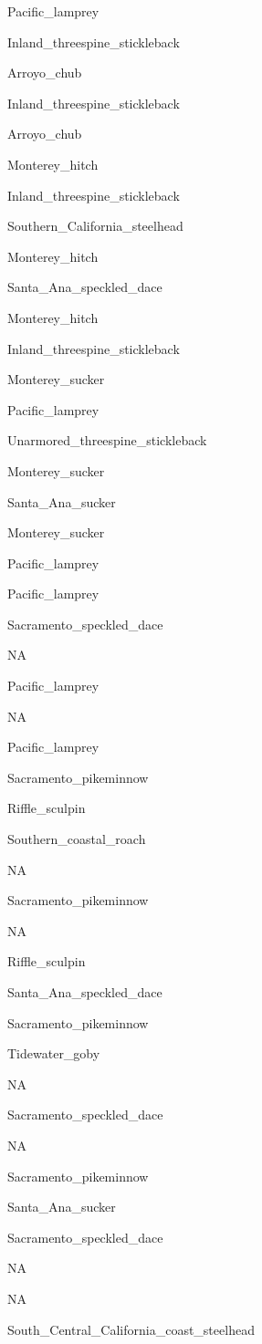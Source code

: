\documentclass[]{article}
\begin{document}
Pacific\_lamprey

Inland\_threespine\_stickleback

Arroyo\_chub

Inland\_threespine\_stickleback

Arroyo\_chub

Monterey\_hitch

Inland\_threespine\_stickleback

Southern\_California\_steelhead

Monterey\_hitch

Santa\_Ana\_speckled\_dace

Monterey\_hitch

Inland\_threespine\_stickleback

Monterey\_sucker

Pacific\_lamprey

Unarmored\_threespine\_stickleback

Monterey\_sucker

Santa\_Ana\_sucker

Monterey\_sucker

Pacific\_lamprey

Pacific\_lamprey

Sacramento\_speckled\_dace

NA

Pacific\_lamprey

NA

Pacific\_lamprey

Sacramento\_pikeminnow

Riffle\_sculpin

Southern\_coastal\_roach

NA

Sacramento\_pikeminnow

NA

Riffle\_sculpin

Santa\_Ana\_speckled\_dace

Sacramento\_pikeminnow

Tidewater\_goby

NA

Sacramento\_speckled\_dace

NA

Sacramento\_pikeminnow

Santa\_Ana\_sucker

Sacramento\_speckled\_dace

NA

NA

South\_Central\_California\_coast\_steelhead
\end{document}
